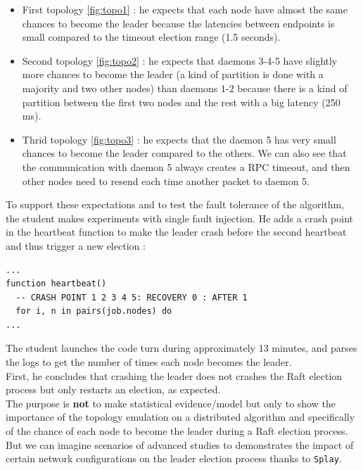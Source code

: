 \documentclass{eplmastersthesis}
\begin{document}
          \begin{itemize}
            \item First topology \ref{fig:topo1} : he expects that each node
            have almost the same chances to become the leader because the
            latencies between endpoints is small compared to the timeout
            election range (1.5 seconds).
            \item Second topology \ref{fig:topo2} : he expects that daemons
            3-4-5 have slightly more chances to become the leader
            (a kind of partition is done with a majority and two other nodes)
            than daemons 1-2 because there is a kind of partition between the
            first two nodes and the rest with a big latency (250 ms).
            \item Thrid topology \ref{fig:topo3} : he expects that the daemon
            5 has very small chances to become the leader compared to the
            others. We can also see that the communication with daemon 5 always
            creates a RPC timeout, and then other nodes need to resend each
            time another packet to daemon 5.
          \end{itemize}

          To support these expectations and to test the fault tolerance of
          the algorithm, the student makes experiments with single fault
          injection. He adds a crash point in the heartbeat function to
          make the leader crash before the second heartbeat and
          thus trigger a new election :

          \begin{lstlisting}[style=MyLua]
...
function heartbeat()
  -- CRASH POINT 1 2 3 4 5: RECOVERY 0 : AFTER 1
  for i, n in pairs(job.nodes) do
...
          \end{lstlisting}

          The student launches the code turn during approximately 13 minutes,
          and parses the logs to get the number of times each node becomes the
          leader.\\
          First, he concludes that crashing the leader does not crashes the
          Raft election process but only restarts an election, as expected.\\
          The purpose is \textbf{not} to make statistical evidence/model but
          only to show the importance of the topology emulation on a
          distributed algorithm and specifically of the chance of each node
          to become the leader during a Raft election process.\\
          But we can imagine scenarios of advanced studies to demonstrates
          the impact of certain network configurations on the leader election
          process thanks to \texttt{Splay}.\\
\end{document}
